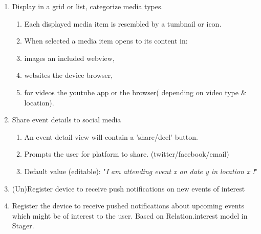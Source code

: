 \begin{enumerate}
\item
Display in a grid or list, categorize media types.
\begin{enumerate}
	\item Each displayed media item is resembled by a tumbnail or icon.
	\item When selected a media item opens to its content in:
	\item images an included webview,
	\item websites the device browser,
	\item for videos the youtube app or the browser( depending on video type \& location).
\end{enumerate}
\item
Share event details to social media
\begin{enumerate}
	\item An event detail view will contain a 'share/deel' button.
	\item Prompts the user for platform to share. (twitter/facebook/email)
	\item Default value (editable): "\emph{I am attending event x on date y in location x !}"
\end{enumerate}
\item
(Un)Register device to receive push notifications on new events of interest
\item
Register the device to receive pushed notifications about upcoming events which might be of interest to the user.
Based on Relation.interest model in Stager.
\end{enumerate}
